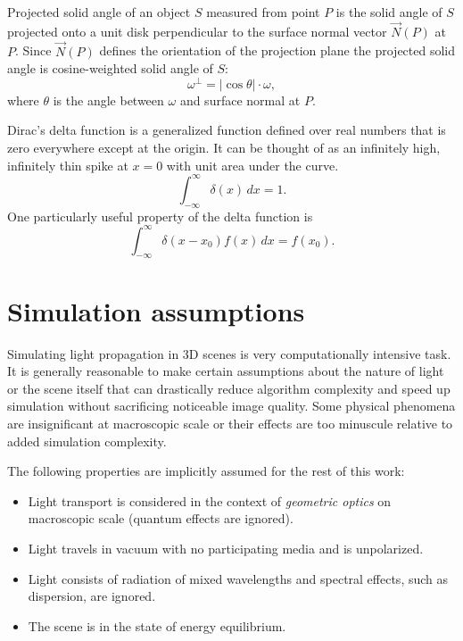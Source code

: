 \begin{df}
Projected solid angle \parencite{nicodemus76} of an object $S$ measured from point $P$ is the solid angle of $S$ projected onto a unit disk perpendicular to the surface normal vector $\vec{N}(P)$ at $P$. Since $\vec{N}(P)$ defines the orientation of the projection plane the projected solid angle is cosine-weighted solid angle of $S$:
\begin{equation}
  \omega^{\perp} = |\cos\theta| \cdot \omega ,
\end{equation}
where $\theta$ is the angle between $\omega$ and surface normal at $P$. 
\end{df}

\begin{df}
  Dirac's delta function \parencite{dirac58} is a generalized function defined over real numbers that is zero everywhere except at the origin. It can be thought of as an infinitely high, infinitely thin spike at $x=0$ with unit area under the curve.
\begin{equation}
  \int_{-\infty}^{\infty} \delta(x) \,dx = 1.
\end{equation}
One particularly useful property of the delta function is
\begin{equation}
  \int_{-\infty}^{\infty} \delta(x - x_{0}) f(x) \,dx = f(x_{0}).
\end{equation}
\end{df}

\section{Simulation assumptions}
\label{sec:assumptions}
Simulating light propagation in 3D scenes is very computationally intensive task. It is generally reasonable to make certain assumptions about the nature of light or the scene itself that can drastically reduce algorithm complexity and speed up simulation without sacrificing noticeable image quality. Some physical phenomena are insignificant at macroscopic scale or their effects are too minuscule relative to added simulation complexity.

The following properties are implicitly assumed for the rest of this work:
\begin{itemize}
\item Light transport is considered in the context of \emph{geometric optics} on macroscopic scale (quantum effects are ignored).
\item Light travels in vacuum with no participating media and is unpolarized.
\item Light consists of radiation of mixed wavelengths and spectral effects, such as dispersion, are ignored.
\item The scene is in the state of energy equilibrium. 
\end{itemize}

